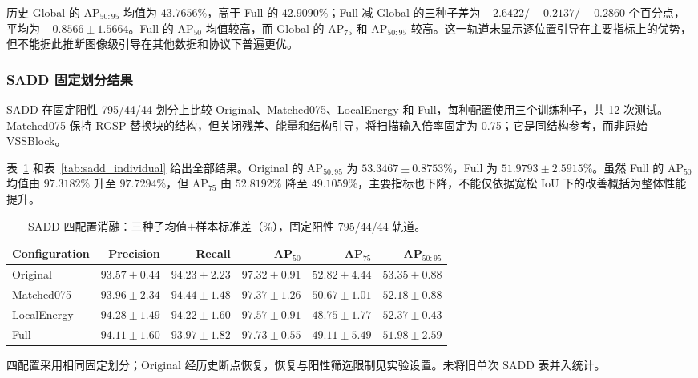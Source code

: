 \documentclass[journal]{IEEEtran}
\begin{document}
历史 Global 的 $\mathrm{AP}_{50:95}$ 均值为 $43.7656\%$，高于 Full 的 $42.9090\%$；Full 减 Global 的三种子差为 $-2.6422/-0.2137/+0.2860$ 个百分点，平均为 $-0.8566\pm1.5664$。Full 的 $\mathrm{AP}_{50}$ 均值较高，而 Global 的 $\mathrm{AP}_{75}$ 和 $\mathrm{AP}_{50:95}$ 较高。这一轨道未显示逐位置引导在主要指标上的优势，但不能据此推断图像级引导在其他数据和协议下普遍更优。

\subsubsection{SADD 固定划分结果}
\label{sec:sadd_ablation}

SADD 在固定阳性 795/44/44 划分上比较 Original、Matched075、LocalEnergy 和 Full，每种配置使用三个训练种子，共 12 次测试。Matched075 保持 RGSP 替换块的结构，但关闭残差、能量和结构引导，将扫描输入倍率固定为 0.75；它是同结构参考，而非原始 VSSBlock。

表~\ref{tab:sadd_current} 和表~\ref{tab:sadd_individual} 给出全部结果。Original 的 $\mathrm{AP}_{50:95}$ 为 $53.3467\pm0.8753\%$，Full 为 $51.9793\pm2.5915\%$。虽然 Full 的 $\mathrm{AP}_{50}$ 均值由 $97.3182\%$ 升至 $97.7294\%$，但 $\mathrm{AP}_{75}$ 由 $52.8192\%$ 降至 $49.1059\%$，主要指标也下降，不能仅依据宽松 IoU 下的改善概括为整体性能提升。

\begin{table}[!t]
\centering
\small
\setlength{\tabcolsep}{3pt}
\caption{SADD 四配置消融：三种子均值$\pm$样本标准差（\%），固定阳性 795/44/44 轨道。}
\label{tab:sadd_current}
\begin{tabular*}{\textwidth}{@{\extracolsep{\fill}}lrrrrr}
\toprule
Configuration & Precision & Recall & AP$_{50}$ & AP$_{75}$ & AP$_{50:95}$ \\
\midrule
Original
& $93.57\pm0.44$ & $94.23\pm2.23$
& $97.32\pm0.91$ & $52.82\pm4.44$ & $53.35\pm0.88$ \\
Matched075
& $93.96\pm2.34$ & $94.44\pm1.48$
& $97.37\pm1.26$ & $50.67\pm1.01$ & $52.18\pm0.88$ \\
LocalEnergy
& $94.28\pm1.49$ & $94.22\pm1.60$
& $97.57\pm0.91$ & $48.75\pm1.77$ & $52.37\pm0.43$ \\
Full
& $94.11\pm1.60$ & $93.97\pm1.82$
& $97.73\pm0.55$ & $49.11\pm5.49$ & $51.98\pm2.59$ \\
\bottomrule
\end{tabular*}
\smallskip
\begin{minipage}{\linewidth}
\footnotesize
四配置采用相同固定划分；Original 经历史断点恢复，恢复与阳性筛选限制见实验设置。未将旧单次 SADD 表并入统计。
\end{minipage}
\end{table}
\end{document}
